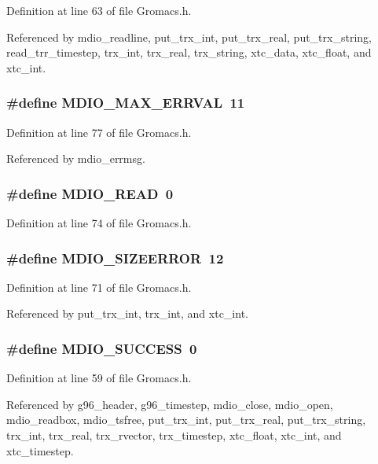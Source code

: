 Definition at line 63 of file Gromacs.h.

Referenced by mdio\_\-readline, put\_\-trx\_\-int, put\_\-trx\_\-real, put\_\-trx\_\-string, read\_\-trr\_\-timestep, trx\_\-int, trx\_\-real, trx\_\-string, xtc\_\-data, xtc\_\-float, and xtc\_\-int.
\subsubsection{\setlength{\rightskip}{0pt plus 5cm}\#define MDIO\_\-MAX\_\-ERRVAL\ 11}\label{Gromacs_8h_a17}




Definition at line 77 of file Gromacs.h.

Referenced by mdio\_\-errmsg.
\subsubsection{\setlength{\rightskip}{0pt plus 5cm}\#define MDIO\_\-READ\ 0}\label{Gromacs_8h_a15}




Definition at line 74 of file Gromacs.h.
\subsubsection{\setlength{\rightskip}{0pt plus 5cm}\#define MDIO\_\-SIZEERROR\ 12}\label{Gromacs_8h_a13}




Definition at line 71 of file Gromacs.h.

Referenced by put\_\-trx\_\-int, trx\_\-int, and xtc\_\-int.
\subsubsection{\setlength{\rightskip}{0pt plus 5cm}\#define MDIO\_\-SUCCESS\ 0}\label{Gromacs_8h_a1}




Definition at line 59 of file Gromacs.h.

Referenced by g96\_\-header, g96\_\-timestep, mdio\_\-close, mdio\_\-open, mdio\_\-readbox, mdio\_\-tsfree, put\_\-trx\_\-int, put\_\-trx\_\-real, put\_\-trx\_\-string, trx\_\-int, trx\_\-real, trx\_\-rvector, trx\_\-timestep, xtc\_\-float, xtc\_\-int, and xtc\_\-timestep.
